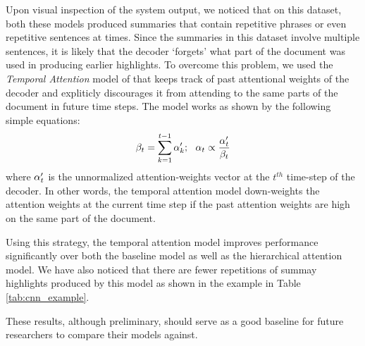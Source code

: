 Upon visual inspection of the system output, we noticed that on this dataset, both these models  produced summaries that contain repetitive phrases or even repetitive sentences at times. Since the summaries in this dataset involve multiple sentences, it is likely that the decoder `forgets' what part of the document was used in producing earlier highlights. To overcome this problem, we used the {\it Temporal Attention} model of  that keeps track of past attentional weights of the decoder and expliticly discourages it from attending to the same parts of the document in future time steps. The model works as shown by the following simple equations:
\begin{equation}
{\bf \beta}_t = \sum_{k=1}^{t-1}{\bf \alpha}_k';~~ {\bf \alpha}_t \propto \frac{{\bf \alpha}'_t}{{\bf \beta}_t} \nonumber
\end{equation}
where ${\bf \alpha}'_t$ is the unnormalized attention-weights vector at the $t^{th}$ time-step of the decoder. In other words, the temporal attention model down-weights the attention weights at the current time step if the past attention weights are high on the same part of the document. 

Using this strategy, the temporal attention model improves performance significantly over both the baseline model as well as the hierarchical attention model. We have also noticed that there are fewer repetitions of summay highlights produced by this model as shown in the example in Table \ref{tab:cnn_example}.





These results, although preliminary, should serve as a good baseline for future researchers to compare their models against. %




